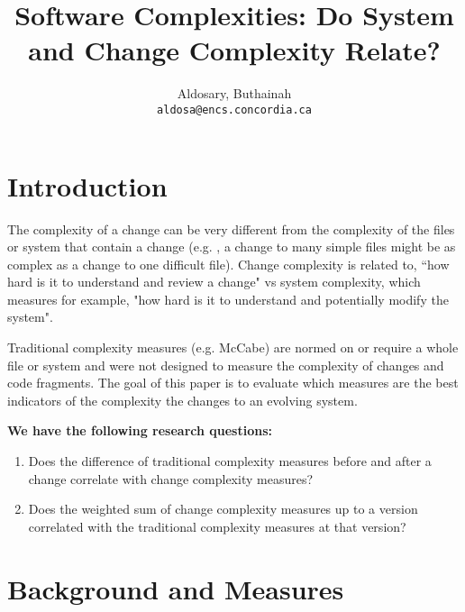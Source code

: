 \documentclass[8pt,twocolumn,a4paper]{article}
\newcommand*{\eg}{e.g. }
\begin{document}
\author{Aldosary, Buthainah\\
\texttt{aldosa@encs.concordia.ca}}

\date{}
\title{Software Complexities: Do System and Change Complexity Relate?}




\maketitle
\section{Introduction}

The complexity of a change can be very different from the complexity of the
files or system that contain a change (\eg, a change to many simple files
might be as complex as a change to one difficult file). Change complexity is
related to, ``how hard is it to understand and review a change" vs system
complexity, which measures for example, "how hard is it to understand and
potentially modify the system". 

Traditional complexity measures (\eg McCabe) are normed on or require a whole
file or system and were not designed to measure the complexity of changes and
code fragments. The goal of this paper is to evaluate which measures are the
best indicators of the complexity the changes to an evolving system. 


\textbf{We have the following research questions:}

\begin{enumerate}

\item Does the difference of traditional complexity measures before and after a change correlate with change complexity measures?

\item Does the weighted sum of change complexity measures up to a version correlated with the traditional complexity measures at that version? 

\end{enumerate}

\section{Background and Measures}
\end{document}
